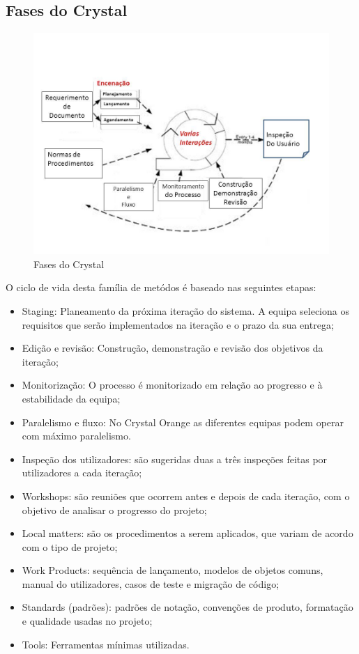 \subsection{Fases do Crystal}

\begin{figure}[H]
    \centering
    \includegraphics[scale=0.5]{Imagens/slide_1.jpg}
    \caption{Fases do Crystal}
    \label{fig:crystal2}
\end{figure}

O ciclo de vida desta família de metódos é baseado nas seguintes etapas:

\begin{itemize}

    \item Staging: Planeamento da próxima iteração do sistema. A equipa seleciona os requisitos que serão implementados na iteração e o prazo da sua entrega;
    \item Edição e revisão: Construção, demonstração e revisão dos objetivos da iteração;
    \item Monitorização: O processo é monitorizado em relação ao progresso e à estabilidade da equipa;
    \item Paralelismo e fluxo: No Crystal Orange as diferentes equipas podem operar com máximo paralelismo.
    \item Inspeção dos utilizadores: são sugeridas duas a três inspeções feitas por utilizadores a cada iteração;
    \item Workshops: são reuniões que ocorrem antes e depois de cada iteração, com o objetivo de analisar o progresso do projeto;
    \item Local matters: são os procedimentos a serem aplicados, que variam de acordo com o tipo de projeto;
    \item Work Products: sequência de lançamento, modelos de objetos comuns, manual do utilizadores, casos de teste e migração de código;
    \item Standards (padrões): padrões de notação, convenções de produto, formatação e qualidade usadas no projeto;
    \item Tools: Ferramentas mínimas utilizadas.
\end{itemize}

